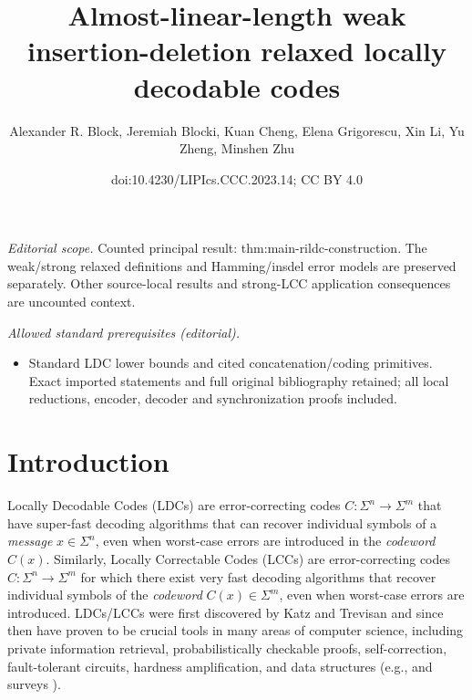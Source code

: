 \documentclass[10pt,a4paper]{article}
\title{Almost-linear-length weak insertion-deletion relaxed locally decodable codes}
\author{Alexander R. Block, Jeremiah Blocki, Kuan Cheng, Elena Grigorescu, Xin Li, Yu Zheng, Minshen Zhu}
\date{doi:10.4230/LIPIcs.CCC.2023.14; CC BY 4.0}
\theoremstyle{remark}
\begin{document}
\maketitle
\noindent\textit{Editorial scope.} Counted principal result: thm:main-rildc-construction. The weak/strong relaxed definitions and Hamming/insdel error models are preserved separately. Other source-local results and strong-LCC application consequences are uncounted context.\par\medskip
\noindent\textit{Allowed standard prerequisites (editorial).}\begin{itemize}
\item Standard LDC lower bounds and cited concatenation/coding primitives. Exact imported statements and full original bibliography retained; all local reductions, encoder, decoder and synchronization proofs included.
\end{itemize}\medskip
\section{Introduction}\label{sec:intro}

Locally Decodable Codes (LDCs) \cite{KatzT00, SudanTV99} are error-correcting codes $C: \Sigma^n \rightarrow \Sigma^m$ that have super-fast decoding algorithms that can recover individual symbols of a {\em message} $x\in \Sigma^n$, even when worst-case errors are introduced in the {\em codeword} $C(x)$. Similarly, Locally Correctable Codes (LCCs) are error-correcting codes $C: \Sigma^n \rightarrow \Sigma^m$ for which there exist very fast decoding algorithms that recover individual symbols of the {\em codeword} $C(x)\in \Sigma^m$, even when worst-case errors are introduced. LDCs/LCCs were first discovered by Katz and Trevisan \cite{KatzT00} and since then 
have proven to be crucial tools in many areas of computer science, including private information retrieval, probabilistically checkable proofs, self-correction,  fault-tolerant circuits,  hardness amplification, and data structures (e.g., \cite{BabaiFLS91,LundFKN92,BlumLR93,BlumK95,ChorKGS98,ChenGW13,AndoniLRW17} and surveys \cite{Tre04-survey,Gasarch04}).
\end{document}
